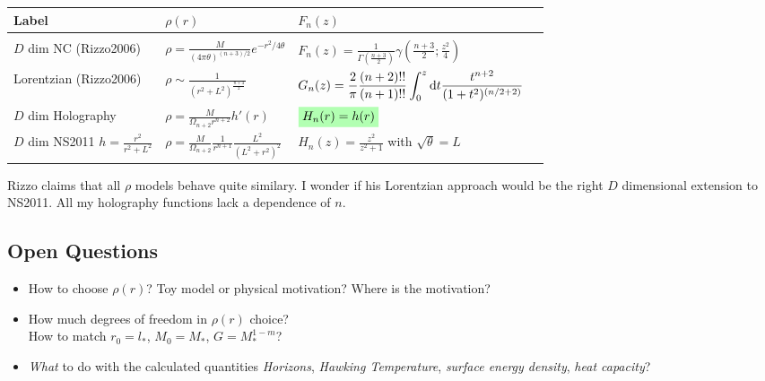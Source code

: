 \documentclass[10pt,a4paper, fleqn]{article}
\newcommand{\highlight}[1]{%
  \colorbox{green!30}{$\displaystyle#1$}}
\begin{document}
\begin{center}
  \begin{tabular}{ llll }
   \firsthline
   Label & $\rho(r)$ & $F_n(z)$ \\
    \hline \\
    $D$ dim NC (Rizzo2006) & $\displaystyle \rho = \frac{M}{(4\pi\theta)^{(n+3)/2}} e^{-r^2/4\theta}$ &  $\displaystyle F_n(z)=\frac{1}{\Gamma\left(\frac{n+3}{2}\right)} \gamma\left( \frac{n+3}{2} ; \frac{z^2}{4} \right)$   \\[3ex]
    Lorentzian (Rizzo2006) & $\displaystyle \rho \sim \frac{1}{(r^2 + L^2)^{\frac{n+4}{2}}}$ &  $\displaystyle G_n(z) = \frac{2}{\pi} \frac{(n+2)!!}{(n+1)!!} \int_0^z \mathrm{d} t \frac{t^{n+2}}{(1+t^2)^{(n/2+2)}}$ \\[3ex]
    $D$ dim Holography & $\displaystyle \rho = \frac{M}{\Omega_{n+2} r^{n+2}} h'(r)$ & $\displaystyle \highlight{H_n(r) = h(r)}$ \\[3ex]
    $D$ dim NS2011 $ h=\frac{r^2}{r^2+L^2}$\qquad & $\displaystyle \rho=\frac{M}{\Omega_{n+2}}\frac{1}{r^{n+1}}\frac{L^2}{(L^2 + r^2)^2}$\qquad\qquad & $\displaystyle H_n(z)=\frac{z^2}{z^2 + 1}$ with $\sqrt{\theta}=L$ \\[3ex]
    \hline
  \end{tabular}
\end{center}

Rizzo claims that all $\rho$ models behave quite similary. I wonder if his Lorentzian approach would be the right $D$ dimensional extension to NS2011. All my holography functions lack a dependence of $n$.

\subsection{Open Questions}

\begin{itemize}
\item How to choose $\rho(r)$? Toy model or physical motivation? Where is the motivation?

\item How much degrees of freedom in $\rho(r)$ choice? \\ How to match $r_0 = l_*$, $M_0 = M_*$, $G=M^{1-m}_*$?

\item {\it What} to do with the calculated quantities {\it Horizons}, {\it Hawking Temperature}, {\it surface energy density}, {\it heat capacity}?


\end{itemize}








\end{document}

